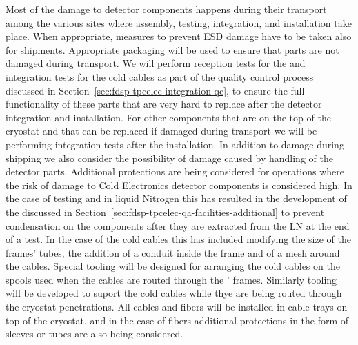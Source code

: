 Most of the damage to detector components happens during their
transport among the various sites where assembly, testing, integration,
and installation take place. When appropriate, measures to prevent
ESD damage have to be taken also for shipments. Appropriate 
packaging will be used to ensure that parts are not damaged
during transport. We will perform reception tests for the 
 and integration tests for the cold cables as
part of the quality control process discussed in 
Section~\ref{sec:fdsp-tpcelec-integration-qc}, to ensure the 
full functionality of these parts that are very hard to replace 
after the detector integration and installation. For other 
components that are on the top of the cryostat and that
can be replaced if damaged during transport we will be
performing integration tests after the installation. 
In addition to damage during shipping we also consider the
possibility of damage caused by handling of the detector parts.
Additional protections are being considered for operations where
the risk of damage to Cold Electronics detector components is
considered high. In the case of testing  and  
in liquid Nitrogen this has resulted in the development of the
 discussed in Section~\ref{sec:fdsp-tpcelec-qa-facilities-additional}
to prevent condensation on the components after they are extracted from
the LN at the end of a test. In the case of the cold cables this 
has included modifying the size of the  frames' tubes, 
the addition of a conduit inside the frame and of a mesh around 
the cables. Special tooling will be designed for arranging the
cold cables on the spools used when the cables are routed through
the ' frames. Similarly tooling will be developed to 
suport the cold cables while thye are being routed through the 
cryostat penetrations. All cables and fibers will
be installed in cable trays on top of the cryostat, and in the case
of fibers additional protections in the form of sleeves or tubes 
are also being considered. 

